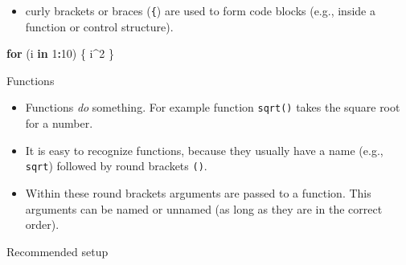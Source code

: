\documentclass[ignorenonframetext,,t]{beamer}
\let\oldtextbf\textbf
\renewcommand{\textbf}[1]{\textcolor{spamwell}{\oldtextbf{#1}}}
\providecommand{\tightlist}{%
\setlength{\itemsep}{0pt}\setlength{\parskip}{0pt}}
\newenvironment{Shaded}{\begin{snugshade}}{\end{snugshade}}
\newcommand{\ControlFlowTok}[1]{\textcolor[rgb]{0.13,0.29,0.53}{\textbf{#1}}}
\newcommand{\DecValTok}[1]{\textcolor[rgb]{0.00,0.00,0.81}{#1}}
\newcommand{\NormalTok}[1]{#1}
\newcommand{\SpecialCharTok}[1]{\textcolor[rgb]{0.81,0.36,0.00}{\textbf{#1}}}
\providecommand{\tightlist}{%
\setlength{\itemsep}{0pt}\setlength{\parskip}{0pt}}
\renewcommand{\tightlist}{\setlength{\itemsep}{1.4ex}\setlength{\parskip}{0pt}}
\begin{document}
\begin{frame}[fragile]
\begin{itemize}
\tightlist
\item
  curly brackets or braces (\texttt{\{}) are used to form code blocks
  (e.g., inside a function or control structure).
\end{itemize}

\begin{Shaded}
\begin{Highlighting}[]
\ControlFlowTok{for}\NormalTok{ (i }\ControlFlowTok{in} \DecValTok{1}\SpecialCharTok{:}\DecValTok{10}\NormalTok{) \{}
\NormalTok{  i}\SpecialCharTok{\^{}}\DecValTok{2}
\NormalTok{\} }
\end{Highlighting}
\end{Shaded}
\end{frame}

\begin{frame}[fragile]
\begin{block}{Functions}
\label{functions}
\begin{itemize}
\tightlist
\item
  Functions \emph{do} something. For example function \texttt{sqrt()}
  takes the square root for a number.
\item
  It is easy to recognize functions, because they usually have a name
  (e.g., \texttt{sqrt}) followed by round brackets \texttt{()}.
\item
  Within these round brackets arguments are passed to a function. This
  arguments can be named or unnamed (as long as they are in the correct
  order).
\end{itemize}
\end{block}
\end{frame}

\begin{frame}{Recommended setup}
\label{recommended-setup}
\end{frame}
\end{document}

